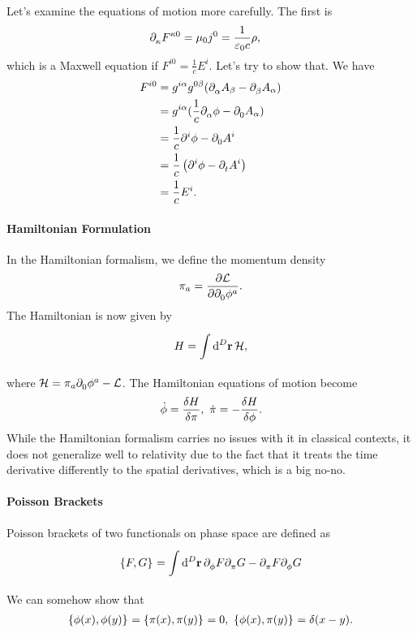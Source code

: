 Let's examine the equations of motion more carefully. The first is
\begin{align*}
	\partial^{}_{\kappa}{F^{\kappa 0}} &= \mu_{0}j^{0} = \frac{1}{\varepsilon_{0}c}\rho,
\end{align*}
which is a Maxwell equation if $F^{i 0} = \frac{1}{c}E^{i}$. Let's try to show that. We have
\begin{align*}
	F^{i0} &= g^{i\alpha}g^{0\beta}(\partial^{}_{\alpha}{A_{\beta}} - \partial^{}_{\beta}{A_{\alpha}}) \\
	       &= g^{i\alpha}(\frac{1}{c}\partial^{}_{\alpha}{\phi} - \partial^{}_{0}{A_{\alpha}}) \\
	       &= \frac{1}{c}\partial^{i}_{}{\phi} - \partial^{}_{0}{A^{i}} \\
	       &= \frac{1}{c}\left(\partial^{i}_{}{\phi} - \partial^{}_{t}{A^{i}}\right) \\
	       &= \frac{1}{c}E^{i}.
\end{align*}

\paragraph{Hamiltonian Formulation}
In the Hamiltonian formalism, we define the momentum density
\begin{align*}
	\pi_{a} = \pdv{\ensuremath{\mathcal{L}}}{\ensuremath{\partial^{}_{0}}\phi^{a}}.
\end{align*}
The Hamiltonian is now given by
\begin{align*}
	H = \int\limits_{}^{}\dd[D]{\vb{r}}\mathcal{H},
\end{align*}
where $\mathcal{H} = \pi_{a}\partial^{}_{0}{\phi^{a}} - \mathcal{L}$. The Hamiltonian equations of motion become
\begin{align*}
	\dot{\phi} = \fdv{H}{\pi},\ \dot{\pi} = -\fdv{H}{\phi}.
\end{align*}
While the Hamiltonian formalism carries no issues with it in classical contexts, it does not generalize well to relativity due to the fact that it treats the time derivative differently to the spatial derivatives, which is a big no-no.


\paragraph{Poisson Brackets}
Poisson brackets of two functionals on phase space are defined as
\begin{align*}
	\left\{F, G\right\}_{} = \int\limits_{}^{}\dd[D]{\vb{r}}{\ensuremath{\partial^{}_{\phi}}{F}\ensuremath{\partial^{}_{\pi}}{G} - \ensuremath{\partial^{}_{\pi}}{F}\ensuremath{\partial^{}_{\phi}}{G}}
\end{align*}
We can somehow show that
\begin{align*}
\pob{\phi(x)}{\phi(y)} = \pob{\pi(x)}{\pi(y)} = 0,\ \pob{\phi(x)}{\pi(y)} = \delta(x - y).
\end{align*}

